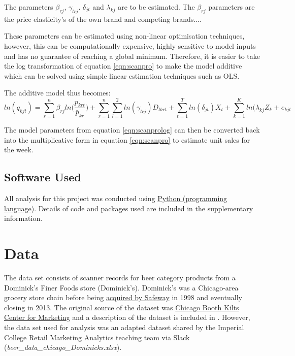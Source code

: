 \documentclass[a4paper,11pt]{article}
\begin{document}
The parameters $\beta_{rj}$, $\gamma_{lrj}$. $\delta_{jt}$ and $\lambda_{kj}$ are to be estimated. The $\beta_{rj}$ parameters are the price elasticity's of the own brand and competing brands....

These parameters can be estimated using non-linear optimisation techniques, however, this can be computationally expensive, highly sensitive to model inputs and has no guarantee of reaching a global minimum. Therefore, it is easier to take the log transformation of equation \ref{eqn:scanpro} to make the model additive which can be solved using simple linear estimation techniques such as OLS. 

The additive model thus becomes:
\begin{equation}
\label{eqn:scanprolog}
    ln(q_{kjt}) = \sum_{r=1}^n{\beta _{rj}ln\Bigg(\frac{p_{krt}}{\bar{p}_{kr}}\Bigg)+ \sum_{r=1}^n\sum_{l=1}^{2}{ln(\gamma_{lrj}){D_{lkrt}}}} + \sum_{t=1}^T{ln(\delta_{jt})X_t} + \sum_{k=1}^K{ln(\lambda_{kj}Z_k} + e_{kjt}
\end{equation}

The model parameters from equation \ref{eqn:scanprolog} can then be converted back into the multiplicative form in equation \ref{eqn:scanpro} to estimate unit sales for the week.


\subsection{Software Used}

All analysis for this project was conducted using \href{https://www.python.org/}{Python (programming language)}. Details of code and packages used are included in the supplementary information.


\section{Data}
The data set consists of scanner records for beer category products from a Dominick's Finer Foods store (Dominick's). Dominick's was a Chicago-area grocery store chain before being \href{https://en.wikipedia.org/wiki/Dominick\%27s}{acquired by Safeway} in 1998 and eventually closing in 2013. The original source of the dataset was  \href{https://www.chicagobooth.edu/research/kilts/datasets/dominicks}{Chicago Booth Kilts Center for Marketing} and a description of the dataset is included in \citep{srinivasan_promotions_2004}. However, the data set used for analysis was an adapted dataset shared by the Imperial College Retail Marketing Analytics teaching team via Slack (\emph{beer\_data\_chicago\_Dominicks.xlsx}).
\end{document}
